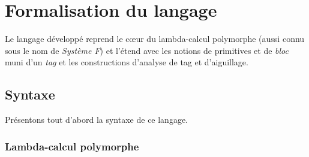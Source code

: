 \newcommand\term{t}
\newcommand\ty{\tau}
\newcommand\tyenv{\Gamma}
\newcommand\csenv{C}

\newcommand\var{x}
\newcommand\app[2]{#1\,#2}
\newcommand\lam[2]{\lambda #1. #2}

\newcommand\val{v}

\newcommand\tyconst{\iota}
\newcommand\tyvar{\alpha}
\newcommand\tykind{*}
\newcommand\tyarrow[2]{#1 \rightarrow #2}
\newcommand\dtype{\epsilon \, \vec{\ty}}

\newcommand\binding[2]{(#1 : #2)}

\newcommand\tyenvnil{\bullet}
\newcommand\tyenvcons[3]{#1; \binding{#2}{#3}}

\newcommand\tycheck[3]{#1 \vdash #2 : #3}
\newcommand\tyenvmem[2]{#1 \in #2}

\newcommand\kw[1]{\operatorname{#1}}

\newcommand\pator{\;|\;}

\newcommand\redto[2]{#1 \longrightarrow #2}

\newcommand\rname[1]{\;\;\textsc{{\small(#1)}}}
\newcommand\rref[1]{\textsc{\small#1}}
\newcommand\rcase[1]{\paragraph{Cas \rref{#1}:}}

\newcommand\freeinenv[1]{#1 \# \tyenv}
\newtheorem{thm}{Théorème}
\newtheorem{lemma}{Lemme}

\section{Formalisation du langage}

Le langage développé reprend le cœur du lambda-calcul polymorphe
\cite{Reynolds94anintroduction} (aussi connu sous le nom de \emph{Système F})
et l'étend avec les notions de primitives et de \emph{bloc} muni d'un
\emph{tag} et les constructions d'analyse de tag et d'aiguillage.

\subsection{Syntaxe}

Présentons tout d'abord la syntaxe de ce langage.

\subsubsection{Lambda-calcul polymorphe} 

